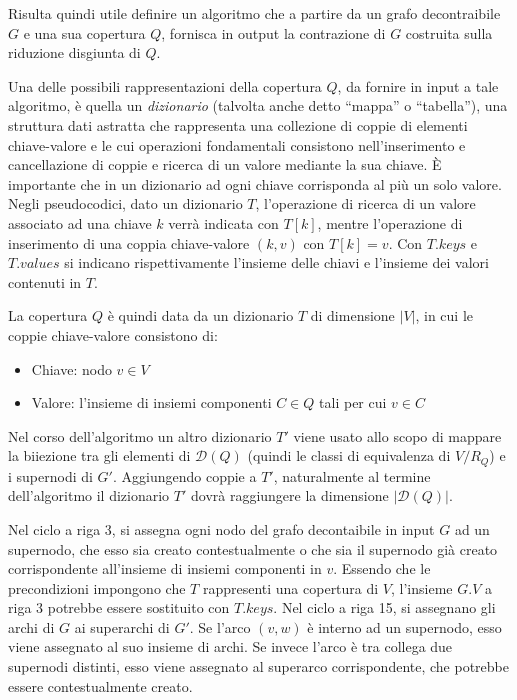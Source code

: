 Risulta quindi utile definire un algoritmo che a partire da un grafo decontraibile $G$ e una sua copertura $Q$,
fornisca in output la contrazione di $G$ costruita sulla riduzione disgiunta di $Q$.

Una delle possibili rappresentazioni della copertura $Q$, da fornire in input a tale algoritmo, è quella un
\textit{dizionario} (talvolta anche detto ``mappa'' o ``tabella''), una struttura dati astratta che rappresenta una
collezione di coppie di elementi chiave-valore e le cui operazioni fondamentali consistono nell'inserimento e
cancellazione di coppie e ricerca di un valore mediante la sua chiave. \`E importante che in un dizionario
ad ogni chiave corrisponda al più un solo valore.
Negli pseudocodici, dato un dizionario $T$, l'operazione di ricerca di un valore associato ad una chiave $k$ verrà
indicata con $T[k]$, mentre l'operazione di inserimento di una coppia chiave-valore $(k, v)$ con $T[k] = v$.
Con $T.keys$ e $T.values$ si indicano rispettivamente l'insieme delle chiavi e l'insieme dei valori contenuti in $T$.

La copertura $Q$ è quindi data da un dizionario $T$ di dimensione $|V|$, in cui le coppie chiave-valore consistono di:
\begin{itemize}
    \item Chiave: nodo $v \in V$
    \item Valore: l'insieme di insiemi componenti $C \in Q$ tali per cui $v \in C$
\end{itemize}

Nel corso dell'algoritmo un altro dizionario $T'$ viene usato allo scopo di mappare la biiezione tra gli elementi
di $\mathcal{D}(Q)$ (quindi le classi di equivalenza di $V/R_Q$) e i supernodi di $G'$.
Aggiungendo coppie a $T'$, naturalmente al termine dell'algoritmo il dizionario $T'$ dovrà raggiungere la dimensione
$|\mathcal{D}(Q)|$. \newline

Nel ciclo a riga 3, si assegna ogni nodo del grafo decontaibile in input $G$ ad un supernodo, che esso sia
creato contestualmente o che sia il supernodo già creato corrispondente all'insieme di insiemi componenti in $v$.
Essendo che le precondizioni impongono che $T$ rappresenti una copertura di $V$, l'insieme $G.V$ a riga 3
potrebbe essere sostituito con $T.keys$.
Nel ciclo a riga 15, si assegnano gli archi di $G$ ai superarchi di $G'$. Se l'arco $(v, w)$ è interno ad un
supernodo, esso viene assegnato al suo insieme di archi. Se invece l'arco è tra collega due supernodi distinti, esso
viene assegnato al superarco corrispondente, che potrebbe essere contestualmente creato.

